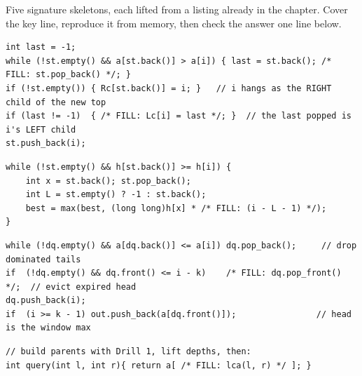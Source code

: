 
Five signature skeletons, each lifted from a listing already in the chapter. Cover the key line,
reproduce it from memory, then check the answer one line below.

\begin{lstlisting}[caption={Drill 1 -- the Cartesian stack build (from \coderef{c26-stackbuild})}]
int last = -1;
while (!st.empty() && a[st.back()] > a[i]) { last = st.back(); /* FILL: st.pop_back() */; }
if (!st.empty()) { Rc[st.back()] = i; }   // i hangs as the RIGHT child of the new top
if (last != -1)  { /* FILL: Lc[i] = last */; }  // the last popped is i's LEFT child
st.push_back(i);
\end{lstlisting}

\begin{lstlisting}[caption={Drill 2 -- the histogram pop (from \coderef{c26-hist84-soln})}]
while (!st.empty() && h[st.back()] >= h[i]) {
    int x = st.back(); st.pop_back();
    int L = st.empty() ? -1 : st.back();
    best = max(best, (long long)h[x] * /* FILL: (i - L - 1) */);
}
\end{lstlisting}

\begin{lstlisting}[caption={Drill 3 -- the sliding-window deque (from \coderef{c26-deque})}]
while (!dq.empty() && a[dq.back()] <= a[i]) dq.pop_back();     // drop dominated tails
if  (!dq.empty() && dq.front() <= i - k)    /* FILL: dq.pop_front() */;  // evict expired head
dq.push_back(i);
if  (i >= k - 1) out.push_back(a[dq.front()]);                // head is the window max
\end{lstlisting}

\begin{lstlisting}[caption={Drill 4 -- RMQ as an ancestor (from \coderef{c26-rmq1647-soln})}]
// build parents with Drill 1, lift depths, then:
int query(int l, int r){ return a[ /* FILL: lca(l, r) */ ]; }
\end{lstlisting}

